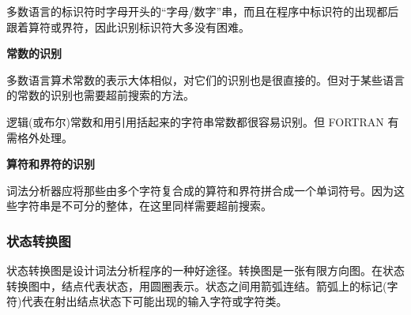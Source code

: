 多数语言的标识符时字母开头的``字母/数字''串，而且在程序中标识符的出现都后跟着算符或界符，因此识别标识符大多没有困难。

\textbf{常数的识别}

多数语言算术常数的表示大体相似，对它们的识别也是很直接的。但对于某些语言的常数的识别也需要超前搜索的方法。

逻辑(或布尔)常数和用引用括起来的字符串常数都很容易识别。但 FORTRAN 有需格外处理。

\textbf{算符和界符的识别}

词法分析器应将那些由多个字符复合成的算符和界符拼合成一个单词符号。因为这些字符串是不可分的整体，在这里同样需要超前搜索。

\subsubsection{状态转换图}

状态转换图是设计词法分析程序的一种好途径。转换图是一张有限方向图。\textcolor{tip}{在状态转换图中，结点代表状态，用圆圈表示。状态之间用箭弧连结。箭弧上的标记(字符)代表在射出结点状态下可能出现的输入字符或字符类。}

